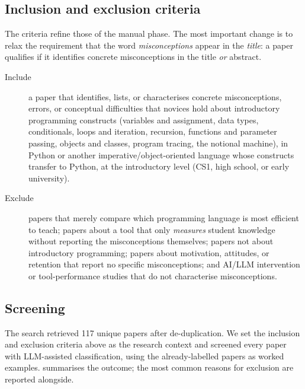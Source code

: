 \subsection{Inclusion and exclusion criteria}

The criteria refine those of the manual phase. The most important change is to
relax the requirement that the word \emph{misconceptions} appear in the
\emph{title}: a paper qualifies if it identifies concrete misconceptions in the
title \emph{or} abstract.

\begin{description}
  \item[Include] a paper that identifies, lists, or characterises concrete
    misconceptions, errors, or conceptual difficulties that novices hold about
    introductory programming constructs (variables and assignment, data types,
    conditionals, loops and iteration, recursion, functions and parameter
    passing, objects and classes, program tracing, the notional machine), in
    Python or another imperative/object-oriented language whose constructs
    transfer to Python, at the introductory level (CS1, high school, or early
    university).
  \item[Exclude] papers that merely compare which programming language is most
    efficient to teach; papers about a tool that only \emph{measures} student
    knowledge without reporting the misconceptions themselves; papers not about
    introductory programming; papers about motivation, attitudes, or retention
    that report no specific misconceptions; and AI/LLM intervention or
    tool-performance studies that do not characterise misconceptions.
\end{description}

\subsection{Screening}

The search retrieved \num{117} unique papers after de-duplication. We set the
inclusion and exclusion criteria above as the research context and screened
every paper with LLM-assisted classification, using the already-labelled papers
as worked examples.  summarises the outcome; the most
common reasons for exclusion are reported alongside.

